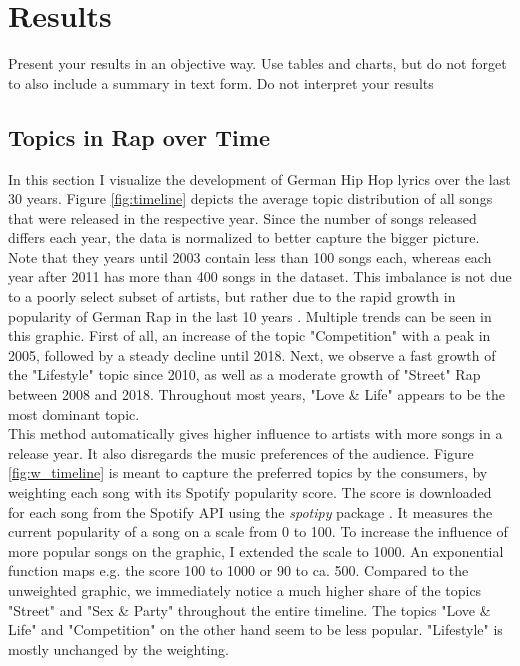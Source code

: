 \documentclass[conference]{IEEEtran}
\begin{document}
\section{Results} \label{results}
Present your results in an objective way. Use tables and charts, but do not
forget to also include a summary in text form. Do not interpret your results

\subsection{Topics in Rap over Time}
In this section I visualize the development of German Hip Hop lyrics over the last 30 years. Figure \ref{fig:timeline} depicts the average topic distribution of all songs that were released in the respective year. Since the number of songs released differs each year, the data is normalized to better capture the bigger picture. Note that they years until 2003 contain less than 100 songs each, whereas each year after 2011 has more than 400 songs in the dataset. This imbalance is not due to a poorly select subset of artists, but rather due to the rapid growth in popularity of German Rap in the last 10 years \cite{musikindustrie}. Multiple trends can be seen in this graphic. First of all, an increase of the topic "Competition" with a peak in 2005, followed by a steady decline until 2018. Next, we observe a fast growth of the "Lifestyle" topic since 2010, as well as a moderate growth of "Street" Rap between 2008 and 2018. Throughout most years, "Love \& Life" appears to be the most dominant topic.\\
This method automatically gives higher influence to artists with more songs in a release year. It also disregards the music preferences of the audience. Figure \ref{fig:w_timeline} is meant to capture the preferred topics by the consumers, by weighting each song with its Spotify popularity score. The score is downloaded for each song from the Spotify API using the \textit{spotipy} package \cite{spotipy}. It measures the current popularity of a song on a scale from 0 to 100. To increase the influence of more popular songs on the graphic, I extended the scale to 1000. An exponential function maps e.g. the score 100 to 1000 or 90 to ca. 500. Compared to the unweighted graphic, we immediately notice a much higher share of the topics "Street" and "Sex \& Party" throughout the entire timeline. The topics "Love \& Life" and "Competition" on the other hand seem to be less popular. "Lifestyle" is mostly unchanged by the weighting.
\end{document}
